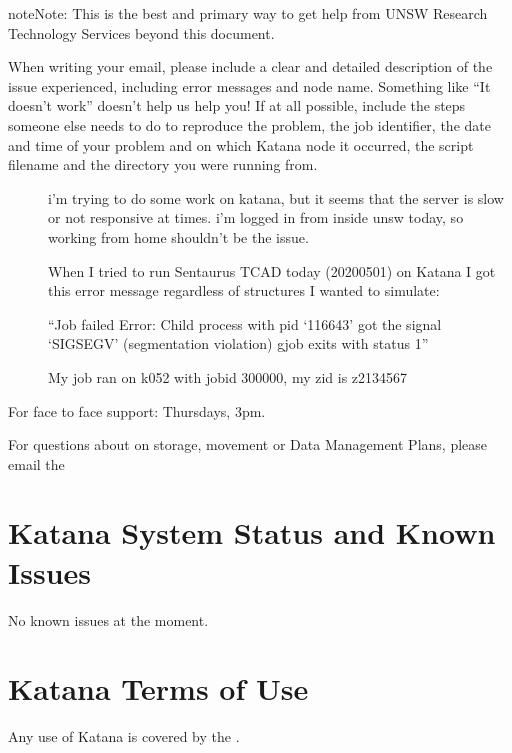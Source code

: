 \documentclass[letterpaper,10pt,english]{sphinxmanual}
\begin{document}
\begin{sphinxadmonition}{note}{Note:}
This is the best and primary way to get help from UNSW Research Technology Services beyond this document.

When writing your email, please include a clear and detailed description of the issue experienced, including error messages and node name. Something like “It doesn’t work” doesn’t help us help you! If at all possible, include the steps someone else needs to do to reproduce the problem, the job identifier, the date and time of your problem and on which Katana node it occurred, the script filename and the directory you were running from.
\begin{description}
\item[{}] \leavevmode
i’m trying to do some work on katana, but it seems that the server is slow or not responsive at times. i’m logged in from inside unsw today, so working from home shouldn’t be the issue.

\item[{}] \leavevmode
When I tried to run Sentaurus TCAD today (2020\sphinxhyphen{}05\sphinxhyphen{}01) on Katana I got this error message regardless of structures I wanted to simulate:

“Job failed
Error: Child process with pid ‘116643’ got the signal ‘SIGSEGV’ (segmentation violation)
gjob exits with status 1”

My job ran on k052 with jobid 300000, my zid is z2134567

\end{description}
\end{sphinxadmonition}

For face to face support:  Thursdays, 3pm.

For questions about  on storage, movement or Data Management Plans, please
email the 


\section{Katana System Status and Known Issues}
\label{\detokenize{help_and_support:katana-system-status-and-known-issues}}
No known issues at the moment.


\section{Katana Terms of Use}
\label{\detokenize{help_and_support:katana-terms-of-use}}
Any use of Katana is covered by the .
\end{document}
